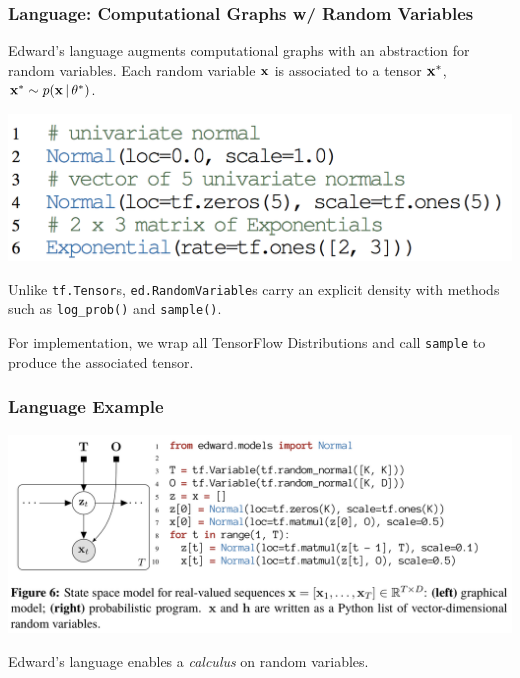 \documentclass[10pt,
               xcolor={usenames,dvipsnames},
               hyperref={colorlinks,linktoc=all,citecolor=Plum,linkcolor=MidnightBlue,urlcolor=MidnightBlue},noamssymb]{beamer}
\begin{document}

\begin{frame}
\frametitle{Language: Computational Graphs w/ Random Variables}
Edward's language augments computational graphs with an abstraction
for random variables.
Each random variable $\boldsymbol{\mathbf{x}}$ is associated to a tensor $\boldsymbol{\mathbf{x}}^*$,
$\boldsymbol{\mathbf{x}}^*\sim p(\boldsymbol{\mathbf{x}}\,|\,\theta^*)$.

\vspace{-1.0ex}
\includegraphics[height=0.20\textwidth]{img/random_variables.png}

Unlike \texttt{tf.Tensor}s, \texttt{ed.RandomVariable}s
carry an explicit density with methods
such as \texttt{log\_prob()} and \texttt{sample()}.

For implementation, we wrap all TensorFlow Distributions and call
\texttt{sample} to produce the associated tensor.
\end{frame}

\begin{frame}
\frametitle{Language Example}
\begin{center}
\includegraphics[width=1.05\textwidth]{img/ssm-program.png}
\end{center}

\vspace{1ex}
Edward's language enables a \emph{calculus} on random variables.
\end{frame}
\end{document}
